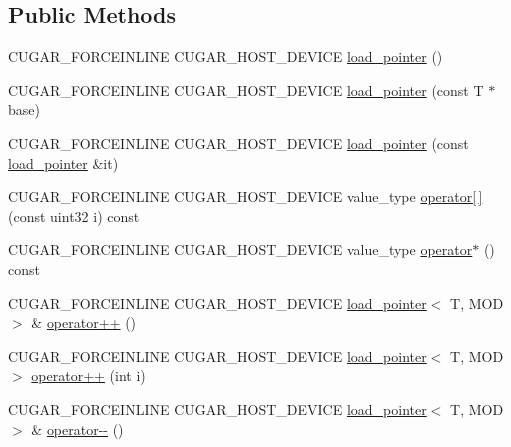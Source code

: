 \subsection*{Public Methods}
\begin{DoxyCompactItemize}
\item 
C\+U\+G\+A\+R\+\_\+\+F\+O\+R\+C\+E\+I\+N\+L\+I\+NE C\+U\+G\+A\+R\+\_\+\+H\+O\+S\+T\+\_\+\+D\+E\+V\+I\+CE \hyperlink{structcugar_1_1cuda_1_1load__pointer_aebee99efd0b548b9e54dcc2498109e7a}{load\+\_\+pointer} ()
\item 
C\+U\+G\+A\+R\+\_\+\+F\+O\+R\+C\+E\+I\+N\+L\+I\+NE C\+U\+G\+A\+R\+\_\+\+H\+O\+S\+T\+\_\+\+D\+E\+V\+I\+CE \hyperlink{structcugar_1_1cuda_1_1load__pointer_a684b97c03124b110d126968f8bd98e16}{load\+\_\+pointer} (const T $\ast$base)
\item 
C\+U\+G\+A\+R\+\_\+\+F\+O\+R\+C\+E\+I\+N\+L\+I\+NE C\+U\+G\+A\+R\+\_\+\+H\+O\+S\+T\+\_\+\+D\+E\+V\+I\+CE \hyperlink{structcugar_1_1cuda_1_1load__pointer_a45b240775f177348dfea497c4bfa0458}{load\+\_\+pointer} (const \hyperlink{structcugar_1_1cuda_1_1load__pointer}{load\+\_\+pointer} \&it)
\item 
C\+U\+G\+A\+R\+\_\+\+F\+O\+R\+C\+E\+I\+N\+L\+I\+NE C\+U\+G\+A\+R\+\_\+\+H\+O\+S\+T\+\_\+\+D\+E\+V\+I\+CE value\+\_\+type \hyperlink{structcugar_1_1cuda_1_1load__pointer_a3620c30f2a6a81ece2a5e2cfcb3a994a}{operator\mbox{[}$\,$\mbox{]}} (const uint32 i) const
\item 
C\+U\+G\+A\+R\+\_\+\+F\+O\+R\+C\+E\+I\+N\+L\+I\+NE C\+U\+G\+A\+R\+\_\+\+H\+O\+S\+T\+\_\+\+D\+E\+V\+I\+CE value\+\_\+type \hyperlink{structcugar_1_1cuda_1_1load__pointer_aba233f41477ba21ed512217b2d7303a1}{operator$\ast$} () const
\item 
C\+U\+G\+A\+R\+\_\+\+F\+O\+R\+C\+E\+I\+N\+L\+I\+NE C\+U\+G\+A\+R\+\_\+\+H\+O\+S\+T\+\_\+\+D\+E\+V\+I\+CE \hyperlink{structcugar_1_1cuda_1_1load__pointer}{load\+\_\+pointer}$<$ T, M\+OD $>$ \& \hyperlink{structcugar_1_1cuda_1_1load__pointer_a404a1717ac8b334bdc235f523023a7a4}{operator++} ()
\item 
C\+U\+G\+A\+R\+\_\+\+F\+O\+R\+C\+E\+I\+N\+L\+I\+NE C\+U\+G\+A\+R\+\_\+\+H\+O\+S\+T\+\_\+\+D\+E\+V\+I\+CE \hyperlink{structcugar_1_1cuda_1_1load__pointer}{load\+\_\+pointer}$<$ T, M\+OD $>$ \hyperlink{structcugar_1_1cuda_1_1load__pointer_ad5e951fdcb006c251a6402d085b77bdf}{operator++} (int i)
\item 
C\+U\+G\+A\+R\+\_\+\+F\+O\+R\+C\+E\+I\+N\+L\+I\+NE C\+U\+G\+A\+R\+\_\+\+H\+O\+S\+T\+\_\+\+D\+E\+V\+I\+CE \hyperlink{structcugar_1_1cuda_1_1load__pointer}{load\+\_\+pointer}$<$ T, M\+OD $>$ \& \hyperlink{structcugar_1_1cuda_1_1load__pointer_acd86b4b8a108df5a57181ab06633b781}{operator-\/-\/} ()

\end{DoxyCompactItemize}
